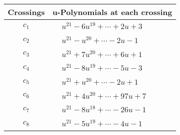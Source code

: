 \documentclass[1p]{elsarticle_modified}
\theoremstyle{definition}
\begin{document}
\begin{tabular}{m{50pt}|m{274pt}}
Crossings & \hspace{64pt}u-Polynomials at each crossing \\
\hline $$\begin{aligned}c_{1}\end{aligned}$$&$\begin{aligned}
&u^{21}-6 u^{19}+\cdots+2 u+3
\end{aligned}$\\
\hline $$\begin{aligned}c_{2}\end{aligned}$$&$\begin{aligned}
&u^{21}- u^{20}+\cdots-2 u-1
\end{aligned}$\\
\hline $$\begin{aligned}c_{3}\end{aligned}$$&$\begin{aligned}
&u^{21}+7 u^{20}+\cdots+6 u+1
\end{aligned}$\\
\hline $$\begin{aligned}c_{4}\end{aligned}$$&$\begin{aligned}
&u^{21}-8 u^{19}+\cdots-5 u-3
\end{aligned}$\\
\hline $$\begin{aligned}c_{5}\end{aligned}$$&$\begin{aligned}
&u^{21}+u^{20}+\cdots-2 u+1
\end{aligned}$\\
\hline $$\begin{aligned}c_{6}\end{aligned}$$&$\begin{aligned}
&u^{21}+4 u^{20}+\cdots+97 u+7
\end{aligned}$\\
\hline $$\begin{aligned}c_{7}\end{aligned}$$&$\begin{aligned}
&u^{21}-8 u^{18}+\cdots-26 u-1
\end{aligned}$\\
\hline $$\begin{aligned}c_{8}\end{aligned}$$&$\begin{aligned}
&u^{21}-5 u^{19}+\cdots-4 u-1
\end{aligned}$\\

\end{tabular}
\end{document}
